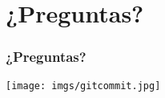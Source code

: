 \section{¿Preguntas?}
\frame
{
\frametitle{¿Preguntas?}
\begin{center}
 \texttt{[image: imgs/gitcommit.jpg]}
\end{center}
}
